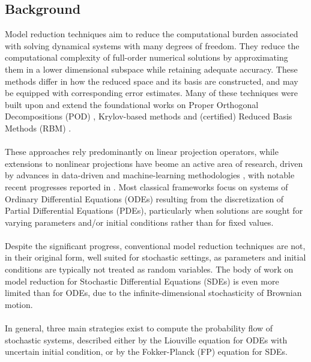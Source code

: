\documentclass[11pt, a4paper, oneside, reqno]{amsart}
\begin{document}
\subsection{Background}
\noindent Model reduction techniques aim to reduce the computational burden associated with solving dynamical systems with many degrees of freedom. 
They reduce the computational complexity of full-order numerical solutions by approximating them in a lower dimensional subspace while retaining adequate accuracy. These methods differ in how the reduced space and its basis are constructed, and may be equipped with corresponding error estimates. Many of these techniques were built upon and extend the foundational works on Proper Orthogonal Decompositions (POD) \cite{POD, rathinam,rowley}, Krylov-based methods \cite{BAI20029,SCHMID_2010} and (certified) Reduced Basis Methods (RBM) \cite{quarteroni,hesthaven2015model}. \\ \ \\
These approaches rely predominantly on linear projection operators, while extensions to nonlinear projections have beome an active area of research, driven by advances in data-driven and machine-learning methodologies \cite{qian2019transform,qian2022reduced,willcox2024distributed,lee2020model}, with notable recent progresses reported in \cite{schwerdtner2024greedy,otto2024role,buchfink2024model}. Most classical frameworks focus on systems of Ordinary Differential Equations (ODEs) resulting from the discretization of Partial Differential Equations (PDEs), particularly when solutions are sought for varying parameters and/or initial conditions rather than for fixed values.  \\ \ \\ 
Despite the significant progress, conventional model reduction techniques are not, in their original form, well suited for stochastic settings, as parameters and initial conditions are typically not treated as random variables. The body of work on model reduction for Stochastic Differential Equations (SDEs) is even more limited than for ODEs, due to the infinite-dimensional stochasticity of Brownian motion. \\ \ \\ 
In general, three main strategies exist to compute the probability flow of stochastic systems, described either by the Liouville equation \cite{Evans_Morriss_2008} for ODEs with uncertain initial condition, or by the Fokker-Planck (FP) equation \cite{risken1989fokker} for SDEs. 
\end{document}
